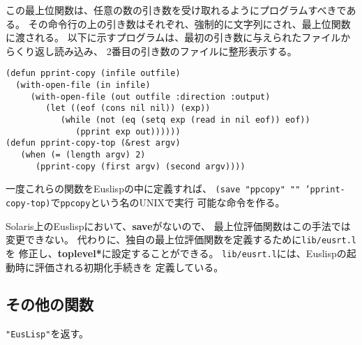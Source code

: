 この最上位関数は、任意の数の引き数を受け取れるようにプログラムすべきである。
その命令行の上の引き数はそれぞれ、強制的に文字列にされ、最上位関数に渡される。
以下に示すプログラムは、最初の引き数に与えられたファイルからくり返し読み込み、
2番目の引き数のファイルに整形表示する。

\begin{verbatim}
(defun pprint-copy (infile outfile)
  (with-open-file (in infile)
     (with-open-file (out outfile :direction :output)
        (let ((eof (cons nil nil)) (exp))
           (while (not (eq (setq exp (read in nil eof)) eof))
              (pprint exp out))))))
(defun pprint-copy-top (&rest argv)
   (when (= (length argv) 2)
      (pprint-copy (first argv) (second argv))))
\end{verbatim}

一度これらの関数をEuslispの中に定義すれば、
{\tt (save "ppcopy" "" 'pprint-copy-top)}で{\tt ppcopy}という名のUNIXで実行
可能な命令を作る。

Solaris上のEuslispにおいて、{\bf save}がないので、
最上位評価関数はこの手法では変更できない。
代わりに、独自の最上位評価関数を定義するために{\tt lib/eusrt.l}を
修正し、{\bf *toplevel*}に設定することができる。
{\tt lib/eusrt.l}には、Euslispの起動時に評価される初期化手続きを
定義している。

\subsection{その他の関数}
\begin{refdesc}
{{\tt "EusLisp"}を返す。}
\end{refdesc}

\newpage
